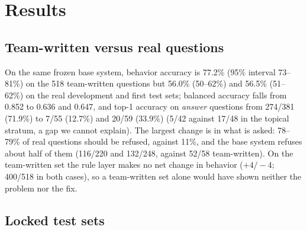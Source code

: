 \section{Results}

\subsection{Team-written versus real questions}

On the same frozen base system, behavior accuracy is 77.2\% (95\% interval 73--81\%) on the 518 team-written questions but 56.0\%
(50--62\%) and 56.5\% (51--62\%) on the real development and first test sets; balanced accuracy falls from 0.852 to 0.636 and 0.647, and
top-1 accuracy on \emph{answer} questions from 274/381 (71.9\%) to 7/55 (12.7\%) and 20/59 (33.9\%) (5/42 against 17/48 in the topical stratum,
a gap we cannot explain). The largest change is in what is asked:
78--79\% of real questions should be refused, against 11\%, and the base system refuses about half of them (116/220 and 132/248,
against 52/58 team-written). On the team-written set the rule layer makes no net change in behavior ($+4/{-}4$; 400/518 in both cases),
so a team-written set alone would have shown neither the problem nor the fix.

\subsection{Locked test sets}\label{sec:test1}

